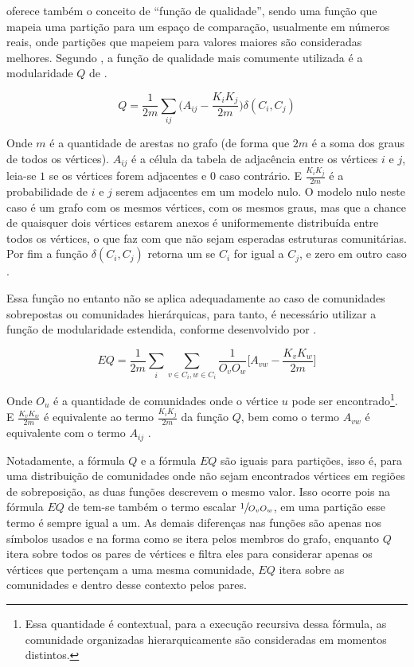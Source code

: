 \documentclass[notes.tex]{subfiles}
\begin{document}
 oferece também o conceito de ``função de qualidade'', sendo uma função que mapeia uma partição para um espaço de comparação, usualmente em números reais, onde partições que mapeiem para valores maiores são consideradas melhores.
Segundo , a função de qualidade mais comumente utilizada é a modularidade $Q$ de .

\begin{equation}\label{eq:mod}
    Q = \frac{1}{2m}\sum_{ij}\Bigg(A_{ij}-\frac{K_iK_j}{2m}\Bigg)\delta(C_i, C_j)
\end{equation}

Onde $m$ é a quantidade de arestas no grafo (de forma que $2m$ é a soma dos graus de todos os vértices).
$A_{ij}$ é a célula da tabela de adjacência entre os vértices $i$ e $j$, leia-se $1$ se os vértices forem adjacentes e $0$ caso contrário.
E $\frac{K_iK_j}{2m}$ é a probabilidade de $i$ e  $j$ serem adjacentes em um modelo nulo.
O modelo nulo neste caso é um grafo com os mesmos vértices, com os mesmos graus, mas que a chance de quaisquer dois vértices estarem anexos é uniformemente distribuída entre todos os vértices, o que faz com que não sejam esperadas estruturas comunitárias.
Por fim a função $\delta(C_i, C_j)$ retorna um se $C_i$ for igual a  $C_j$, e zero em outro caso \cite{fortunato2010community}.

Essa função no entanto não se aplica adequadamente ao caso de comunidades sobrepostas ou comunidades hierárquicas, para tanto, é necessário utilizar a função de modularidade estendida, conforme desenvolvido por .

\begin{equation}\label{eq:mod_e}
    EQ = \frac{1}{2m}\sum_{i}\sum_{v \in C_i, w \in C_i}\frac{1}{O_vO_w}\Bigg[A_{vw} - \frac{K_vK_w}{2m} \Bigg]
\end{equation}

Onde $O_u$ é a quantidade de comunidades onde o vértice $u$ pode ser encontrado\footnote{Essa quantidade é contextual, para a execução recursiva dessa fórmula, as comunidade organizadas hierarquicamente são consideradas em momentos distintos.}.
 E $\frac{K_vK_w}{2m}$ é equivalente ao termo  $\frac{K_iK_j}{2m}$ da função $Q$, bem como o termo $A_{vw}$ é equivalente com o termo  $A_{ij}$ \cite{fortunato2010community}.

Notadamente, a fórmula $Q$ e a fórmula  $EQ$ são iguais para partições, isso é, para uma distribuição de comunidades onde não sejam encontrados vértices em regiões de sobreposição, as duas funções descrevem o mesmo valor.
Isso ocorre pois na fórmula $EQ$ de  tem-se também o termo escalar $\sfrac{1}{O_vO_w}$, em uma partição esse termo é sempre igual a um.
As demais diferenças nas funções são apenas nos símbolos usados e na forma como se itera pelos membros do grafo, enquanto $Q$ itera sobre todos os pares de vértices e filtra eles para considerar apenas os vértices que pertençam a uma mesma comunidade,  $EQ$ itera sobre as comunidades e dentro desse contexto pelos pares.
\end{document}
